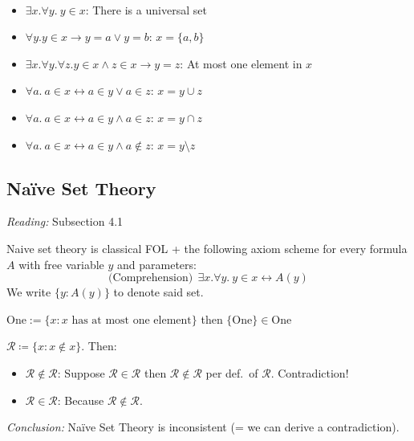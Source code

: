 \documentclass{whrartcl}
\newcommand{\RR}{\mathcal{R}}
\begin{document}
\begin{example}
  \
  \begin{itemize}
  \item $\exists x. \forall y.~y \in x$: There is a universal set
  \item $\forall y. y \in x \to y = a \vee y = b$: $x = \{a, b\}$
  \item $\exists x. \forall y. \forall z. y \in x \wedge z \in x \to y = z$: At
    most one element in $x$
  \item $\forall a.~a \in x \leftrightarrow a \in y \vee a \in z$: $x = y \cup z$
  \item $\forall a.~a \in x \leftrightarrow a \in y \wedge a \in z$: $x = y \cap z$
  \item $\forall a.~a \in x \leftrightarrow a \in y \wedge a \not\in z$: $x = y \setminus z$
  \end{itemize}
\end{example}

\subsection{Na\"ive Set Theory}
\emph{Reading:} Subsection 4.1

\begin{definition}
  Naive set theory is classical FOL + the following axiom scheme for every
  formula $A$ with free variable $y$ and parameters:
  \[
    \text{(Comprehension)}~~\exists x. \forall y.~y \in x \leftrightarrow A(y)
  \]
  We write $\{y : A(y)\}$ to denote said set.
\end{definition}

\begin{example}
  $\text{One} := \{x : x \text{ has at most one element}\}$ then $\{\text{One}\}
  \in \text{One}$
\end{example}

\begin{example}
  $\RR \coloneq \{x : x \not\in x\}$. Then:
  \begin{itemize}
  \item $\RR \not\in \RR$: Suppose $\RR \in \RR$ then $\RR \not\in \RR$ per
    def.\ of $\RR$. Contradiction!
  \item $\RR \in \RR$: Because $\RR \not\in \RR$.
  \end{itemize}
  \emph{Conclusion:} Na\"ive Set Theory is inconsistent (= we can derive a contradiction).
\end{example}
\end{document}
